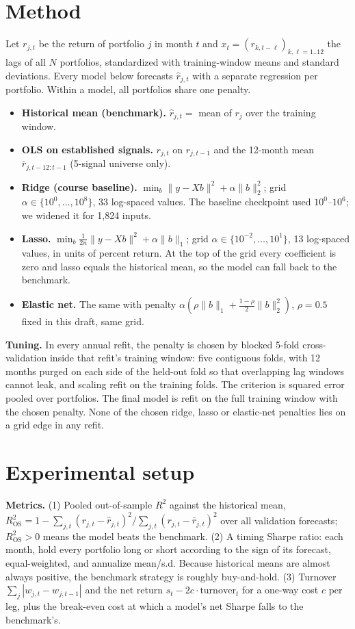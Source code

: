 \documentclass{article}
\newcommand{\ros}{R^2_{\mathrm{OS}}}
\begin{document}
\section{Method}
Let $r_{j,t}$ be the return of portfolio $j$ in month $t$ and $x_t=(r_{k,t-\ell})_{k,\ell=1..12}$ the lags of all $N$ portfolios, standardized with training-window means and standard deviations. Every model below forecasts $\hat r_{j,t}$ with a separate regression per portfolio. Within a model, all portfolios share one penalty.
\begin{itemize}
\item \textbf{Historical mean (benchmark).} $\hat r_{j,t}=$ mean of $r_j$ over the training window.
\item \textbf{OLS on established signals.} $r_{j,t}$ on $r_{j,t-1}$ and the 12-month mean $\bar r_{j,t-12:t-1}$ (5-signal universe only).
\item \textbf{Ridge (course baseline).} $\min_b \|y-Xb\|^2+\alpha\|b\|_2^2$; grid $\alpha\in\{10^0,\dots,10^8\}$, 33 log-spaced values. The baseline checkpoint used $10^0$--$10^6$; we widened it for 1{,}824 inputs.
\item \textbf{Lasso.} $\min_b \tfrac{1}{2n}\|y-Xb\|^2+\alpha\|b\|_1$; grid $\alpha\in\{10^{-2},\dots,10^{1}\}$, 13 log-spaced values, in units of percent return. At the top of the grid every coefficient is zero and lasso equals the historical mean, so the model can fall back to the benchmark.
\item \textbf{Elastic net.} The same with penalty $\alpha(\rho\|b\|_1+\tfrac{1-\rho}{2}\|b\|_2^2)$, $\rho=0.5$ fixed in this draft, same grid.
\end{itemize}
\textbf{Tuning.} In every annual refit, the penalty is chosen by blocked 5-fold cross-validation inside that refit's training window: five contiguous folds, with 12 months purged on each side of the held-out fold so that overlapping lag windows cannot leak, and scaling refit on the training folds. The criterion is squared error pooled over portfolios. The final model is refit on the full training window with the chosen penalty. None of the chosen ridge, lasso or elastic-net penalties lies on a grid edge in any refit.

\section{Experimental setup}
\textbf{Metrics.} (1) Pooled out-of-sample $R^2$ against the historical mean, $\ros=1-\sum_{j,t}(r_{j,t}-\hat r_{j,t})^2/\sum_{j,t}(r_{j,t}-\bar r_{j,t})^2$ over all validation forecasts; $\ros>0$ means the model beats the benchmark. (2) A timing Sharpe ratio: each month, hold every portfolio long or short according to the sign of its forecast, equal-weighted, and annualize mean/s.d. Because historical means are almost always positive, the benchmark strategy is roughly buy-and-hold. (3) Turnover $\sum_j|w_{j,t}-w_{j,t-1}|$ and the net return $s_t-2c\cdot\text{turnover}_t$ for a one-way cost $c$ per leg, plus the break-even cost at which a model's net Sharpe falls to the benchmark's.
\end{document}
